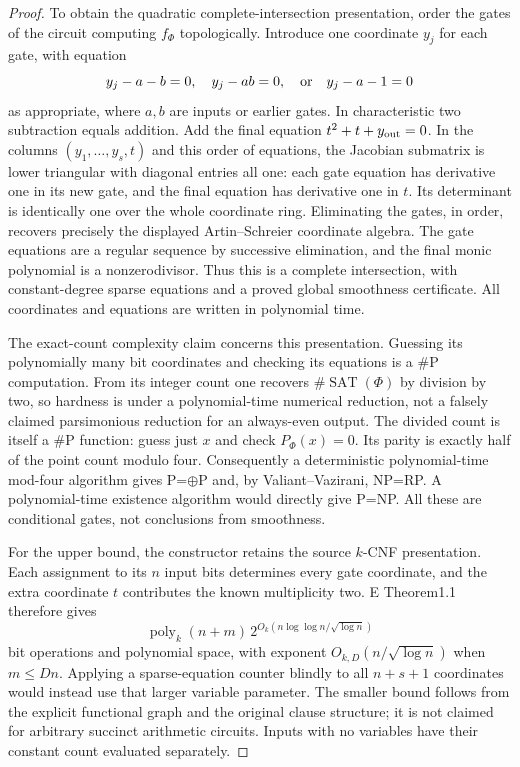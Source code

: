 \begin{proof}
To obtain the quadratic complete-intersection presentation, order the gates of the circuit computing $f_\Phi$ topologically. Introduce one coordinate $y_j$ for each gate, with equation
\[
 y_j-a-b=0,\quad y_j-ab=0,\quad\hbox{or}\quad y_j-a-1=0
\]
as appropriate, where $a,b$ are inputs or earlier gates. In characteristic two subtraction equals addition. Add the final equation $t^2+t+y_{\rm out}=0$. In the columns $(y_1,\ldots,y_s,t)$ and this order of equations, the Jacobian submatrix is lower triangular with diagonal entries all one: each gate equation has derivative one in its new gate, and the final equation has derivative one in $t$. Its determinant is identically one over the whole coordinate ring. Eliminating the gates, in order, recovers precisely the displayed Artin--Schreier coordinate algebra. The gate equations are a regular sequence by successive elimination, and the final monic polynomial is a nonzerodivisor. Thus this is a complete intersection, with constant-degree sparse equations and a proved global smoothness certificate. All coordinates and equations are written in polynomial time.

The exact-count complexity claim concerns this presentation. Guessing its polynomially many bit coordinates and checking its equations is a $\#\mathrm P$ computation. From its integer count one recovers $\#\operatorname{SAT}(\Phi)$ by division by two, so hardness is under a polynomial-time numerical reduction, not a falsely claimed parsimonious reduction for an always-even output. The divided count is itself a $\#\mathrm P$ function: guess just $x$ and check $P_\Phi(x)=0$. Its parity is exactly half of the point count modulo four. Consequently a deterministic polynomial-time mod-four algorithm gives P=$\oplus$P and, by Valiant--Vazirani, NP=RP. A polynomial-time existence algorithm would directly give P=NP. All these are conditional gates, not conclusions from smoothness.

For the upper bound, the constructor retains the source $k$-CNF presentation. Each assignment to its $n$ input bits determines every gate coordinate, and the extra coordinate $t$ contributes the known multiplicity two. E Theorem1.1 therefore gives
\[
 \operatorname{poly}_{k}(n+m)\,
 2^{O_k(n\log\log n/\sqrt{\log n})}
\]
bit operations and polynomial space, with exponent $O_{k,D}(n/\sqrt{\log n})$ when $m\leq Dn$. Applying a sparse-equation counter blindly to all $n+s+1$ coordinates would instead use that larger variable parameter. The smaller bound follows from the explicit functional graph and the original clause structure; it is not claimed for arbitrary succinct arithmetic circuits. Inputs with no variables have their constant count evaluated separately.
\end{proof}
